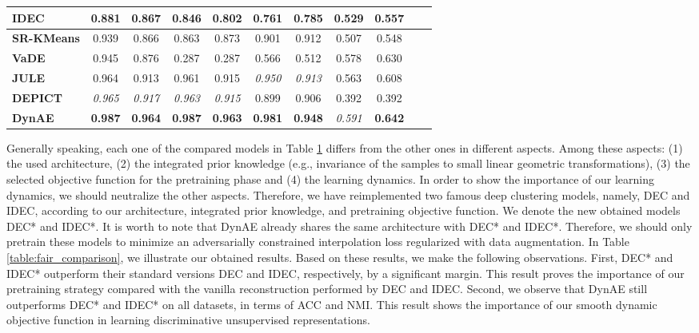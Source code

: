 \documentclass{article}
\begin{document}
\begin{table}[h!]
\begin{center}
\begin{small}
\begin{tabular}{|p{3cm}|c|c|c|c|c|c|c|c|c|c|}
    \textbf{IDEC} & 0.881 & 0.867 & 0.846 & 0.802 & 0.761 & 0.785 & 0.529 & 0.557 \\ \hline
    \textbf{SR-KMeans} & 0.939 & 0.866 & 0.863 & 0.873 & 0.901 & 0.912 & 0.507 & 0.548 \\ \hline
    \textbf{VaDE} & 0.945 & 0.876 & 0.287 & 0.287 & 0.566 & 0.512 & 0.578 & 0.630  \\ \hline
    \textbf{JULE} & 0.964 & 0.913 & 0.961 & 0.915 & \textit{0.950} & \textit{0.913} &  0.563 & 0.608  \\ \hline
    \textbf{DEPICT} & \textit{0.965} & \textit{0.917} & \textit{0.963} & \textit{0.915} & 0.899 & 0.906 &  0.392 & 0.392 \\ \hline
    \textbf{DynAE} & \textbf{0.987} & \textbf{0.964} & \textbf{0.987} & \textbf{0.963} & \textbf{0.981} & \textbf{0.948} & \textit{0.591} & \textbf{0.642} \\ \hline 
  \end{tabular}
  \label{table:ACC_NMI_comparison}
  \end{small}
  \end{center}
  \vskip 0.1in
\end{table}

Generally speaking, each one of the compared models in Table \ref{table:ACC_NMI_comparison} differs from the other ones in different aspects. Among these aspects: (1) the used architecture, (2) the integrated prior knowledge (e.g., invariance of the samples to small linear geometric transformations), (3) the selected objective function for the pretraining phase and (4) the learning dynamics. In order to show the importance of our learning dynamics, we should neutralize the other aspects. Therefore, we have reimplemented two famous deep clustering models, namely, DEC and IDEC, according to our architecture, integrated prior knowledge, and pretraining objective function. We denote the new obtained models DEC* and IDEC*. It is worth to note that DynAE already shares the same architecture with DEC* and IDEC*. Therefore, we should only pretrain these models to minimize an adversarially constrained interpolation loss regularized with data augmentation. In Table \ref{table:fair_comparison}, we illustrate our obtained results. Based on these results, we make the following observations. First, DEC* and IDEC* outperform their standard versions DEC and IDEC, respectively, by a significant margin. This result proves the importance of our pretraining strategy compared with the vanilla reconstruction performed by DEC and IDEC. Second, we observe that DynAE still outperforms DEC* and IDEC* on all datasets, in terms of ACC and NMI. This result shows the importance of our smooth dynamic objective function in learning discriminative unsupervised representations. 
\end{document}

